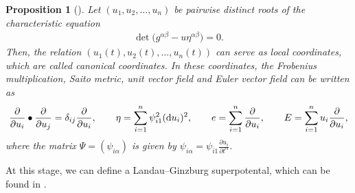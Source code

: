 \documentclass[11pt]{article}
\numberwithin{equation}{section}
\numberwithin{equation}{section}
\newtheorem{Proposition}[Theorem]{Proposition}
 { \theoremstyle{definition}
\newtheorem{Definition}[Theorem]{Definition}
\newtheorem{Remark}[Theorem]{Remark} }
\begin{document}
\begin{Proposition}[\cite{B.Dubrovin2,B.Dubrovin3}]
Let $(u_1,u_2,\dots,u_n)$ be pairwise distinct roots of the characteristic equation
\begin{gather}\label{spectral curve}
\det\bigl(g^{\alpha\beta} -u\eta^{\alpha\beta} \bigr) = 0.
\end{gather}
Then, the relation $(u_1(t),u_2(t),\dots,u_n(t))$ can serve as local coordinates, which are called canonical coordinates. In these coordinates, the Frobenius multiplication, Saito metric, unit vector field and Euler vector field can be written as
\begin{gather}
\frac{\partial}{\partial u_i}\bullet \frac{\partial}{\partial u_j}=\delta_{ij}\frac{\partial}{\partial u_i},\qquad \eta=\sum_{i=1}^{n}\psi_{i1}^2 ({\rm d}u_i)^2, \qquad e=\sum_{i=1}^n\frac{\partial}{\partial u_i},\qquad E=\sum_{i=1}^n u_i\frac{\partial}{\partial u_i},\label{Dubrovin Frobenius structure in canonical coordinates 1}
\end{gather}
where the matrix $\Psi=( \psi_{i\alpha})$ is given by
$
\psi_{i\alpha}=\psi_{i1}\frac{\partial u_i}{\partial t^{\alpha}}$.
\end{Proposition}
At this stage, we can define a Landau--Ginzburg superpotental, which can be found in \cite[Definition~5.7]{B.Dubrovin3}.
\end{document}
